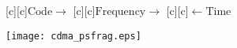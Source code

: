 \documentclass{article}
\begin{document}
\begin{figure}[htb]
  \begin{center}

        [c][c]{\hspace{5mm}$\mathrm{Code}\rightarrow$}
        [c][c]{\hspace{7mm}$\mathrm{Frequency}\rightarrow$}
        [c][c]{$\leftarrow\mathrm{Time}$}

    \texttt{[image: cdma\_psfrag.eps]}
    \end{center}
\end{figure}
\end{document}
